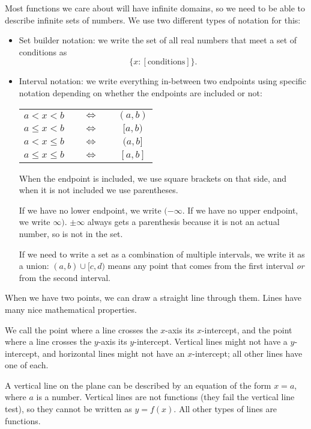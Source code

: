 \documentclass{article}
\begin{document}
Most functions we care about will have infinite domains, so we need to be able to describe infinite sets of numbers. We use two different types of notation for this:
\begin{itemize}
    \item Set builder notation: we write the set of all real numbers that meet a set of conditions as \[\{x:[\text{conditions}]\}.\]
    \item Interval notation: we write everything in-between two endpoints using specific notation depending on whether the endpoints are included or not:
        \begin{center}
        \begin{tabular}{ccc}
            $a<x<b$ & $\quad\Leftrightarrow\quad$ & $(a,b)$ \\
            $a\leq x<b$ & $\Leftrightarrow$ & $[a,b)$ \\
            $a<x\leq b$ & $\Leftrightarrow$ & $(a,b]$ \\
            $a\leq x \leq b$ & $\Leftrightarrow$ & $[a,b]$
        \end{tabular}
        \end{center}
        When the endpoint is included, we use square brackets on that side, and when it is not included we use parentheses.

        If we have no lower endpoint, we write $(-\infty$. If we have no upper endpoint, we write $\infty)$. $\pm\infty$ always gets a parenthesis because it is not an actual number, so is not in the set.
        
        If we need to write a set as a combination of multiple intervals, we write it as a union: $(a,b)\cup[c,d)$ means any point that comes from the first interval {\it or} from the second interval.
\end{itemize}

When we have two points, we can draw a straight line through them. Lines have many nice mathematical properties.

We call the point where a line crosses the $x$-axis its $x$-intercept, and the point where a line crosses the $y$-axis its $y$-intercept. Vertical lines might not have a $y$-intercept, and horizontal lines might not have an $x$-intercept; all other lines have one of each.

A vertical line on the plane can be described by an equation of the form $x=a$, where $a$ is a number. Vertical lines are not functions (they fail the vertical line test), so they cannot be written as $y=f(x)$.
All other types of lines are functions.
\end{document}
